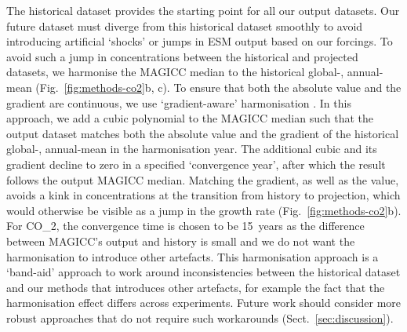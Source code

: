 The historical dataset provides the starting point for all our output datasets.
Our future dataset must diverge from this historical dataset smoothly
to avoid introducing artificial `shocks' or jumps in ESM output based on our forcings.
To avoid such a jump in concentrations between the historical and projected datasets,
we harmonise the MAGICC median to the historical global-, annual-mean (Fig.~\ref{fig:methods-co2}b, c).
To ensure that both the absolute value and the gradient are continuous,
we use `gradient-aware' harmonisation \citep{bockting_gradient-aware-harmonisation_2025}.
In this approach, we add a cubic polynomial to the MAGICC median
such that the output dataset matches both the absolute value and the gradient of the historical global-, annual-mean
in the harmonisation year.
The additional cubic and its gradient decline to zero in a specified `convergence year',
after which the result follows the output MAGICC median.
Matching the gradient, as well as the value, avoids a kink in concentrations at the transition from history to projection,
which would otherwise be visible as a jump in the growth rate (Fig.~\ref{fig:methods-co2}b).
For CO_2, the convergence time is
chosen to be 15~years as the difference between MAGICC's output and history is small
and we do not want the harmonisation to introduce other artefacts.
This harmonisation approach is a `band-aid' approach to work around inconsistencies between the historical dataset and our methods
that introduces other artefacts, for example the fact that the harmonisation effect differs across experiments.
Future work should consider more robust approaches that do not require such workarounds (Sect.~\ref{sec:discussion}).

